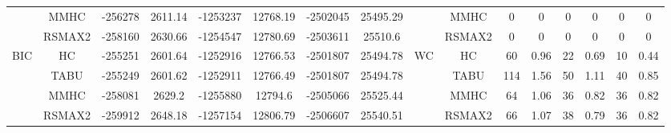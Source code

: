 \begin{table}[p]
{\begin{tabular}{cc||cc|cc|cc||cc|cc|cc|cc}
& MMHC &	-256278 & 	2611.14 & 	-1253237 & 	12768.19 & 	-2502045 & 	25495.29 & 	& MMHC &	0 & 	0 & 	0 & 	0 & 	0 & 	0\tabularnewline													
& RSMAX2 &	-258160 & 	2630.66 & 	-1254547 & 	12780.69 & 	-2503611 & 	25510.6 & 	& RSMAX2 &	0 & 	0 & 	0 & 	0 & 	0 & 	0\tabularnewline													
\hline																										
\multirow{4}{*}{BIC} & HC &	-255251 & 	2601.64 & 	-1252916 & 	12766.53 & 	-2501807 & 	25494.78 & 	\multirow{4}{*}{WC} & HC &	60 & 	0.96 & 	22 & 	0.69 & 	10 & 	0.44\tabularnewline													
& TABU &	-255249 & 	2601.62 & 	-1252911 & 	12766.49 & 	-2501807 & 	25494.78 & 	& TABU &	114 & 	1.56 & 	50 & 	1.11 & 	40 & 	0.85\tabularnewline													
& MMHC &	-258081 & 	2629.2 & 	-1255880 & 	12794.6 & 	-2505066 & 	25525.44 & 	& MMHC &	64 & 	1.06 & 	36 & 	0.82 & 	36 & 	0.82\tabularnewline													
& RSMAX2 &	-259912 & 	2648.18 & 	-1257154 & 	12806.79 & 	-2506607 & 	25540.51 & 	& RSMAX2 &	66 & 	1.07 & 	38 & 	0.79 & 	36 & 	0.82\tabularnewline													
\hline																										
\end{tabular}																										
}																										
\end{table}																										
